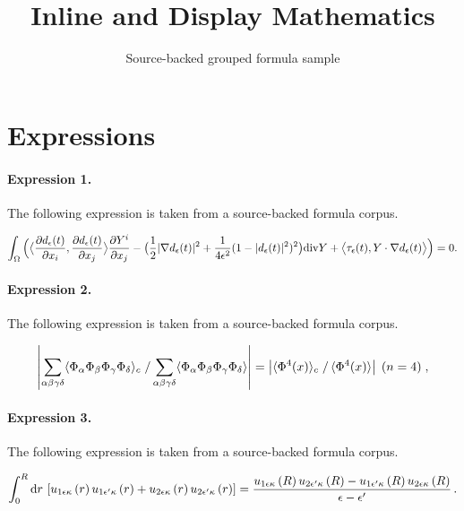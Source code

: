 \documentclass[11pt]{article}
\title{Inline and Display Mathematics}
\author{Source-backed grouped formula sample}
\date{}
\begin{document}
\maketitle
\section{Expressions}
\paragraph{Expression 1.} The following expression is taken from a source-backed formula corpus.

\begin{align*}\int_\Omega \Big(\big\langle \frac{\partial d_\epsilon(t)}{\partial x_i},\frac{\partial d_\epsilon(t)}{\partial x_j}\big\rangle \frac{\partial Y^i}{\partial x_j}-\big(\frac12|\nabla d_\epsilon(t)|^2+\frac{1}{4\epsilon^2}(1-|d_\epsilon(t)|^2)^2\big){\rm{div}}Y+\big\langle \tau_\epsilon(t), Y\cdot\nabla d_\epsilon(t)\big\rangle\Big)=0.\end{align*}

\paragraph{Expression 2.} The following expression is taken from a source-backed formula corpus.

\begin{align*}\left| \sum_{\alpha \beta \gamma \delta}\langle \Phi_{\alpha} \Phi_{\beta} \Phi_{\gamma} \Phi_{\delta} \rangle_c\left. \right/ \sum_{\alpha \beta \gamma \delta}\langle \Phi_{\alpha} \Phi_{\beta} \Phi_{\gamma} \Phi_{\delta} \rangle\right|=\left| \langle \Phi^4(x) \rangle_c \left. \right/\langle \Phi^4(x) \rangle \right|\; (n=4) \; ,\end{align*}

\paragraph{Expression 3.} The following expression is taken from a source-backed formula corpus.

\begin{align*}\int_0^R{\rm d}r\,\left[u_{1\epsilon\kappa}\left(r\right)u_{1\epsilon'\kappa}\left(r\right)+u_{2\epsilon\kappa}\left(r\right)u_{2\epsilon'\kappa}\left(r\right)\right]=\frac{u_{1\epsilon\kappa}\left(R\right)u_{2\epsilon'\kappa}\left(R\right)-u_{1\epsilon'\kappa}\left(R\right)u_{2\epsilon\kappa}\left(R\right)}{\epsilon-\epsilon'}\,.\end{align*}
\end{document}

